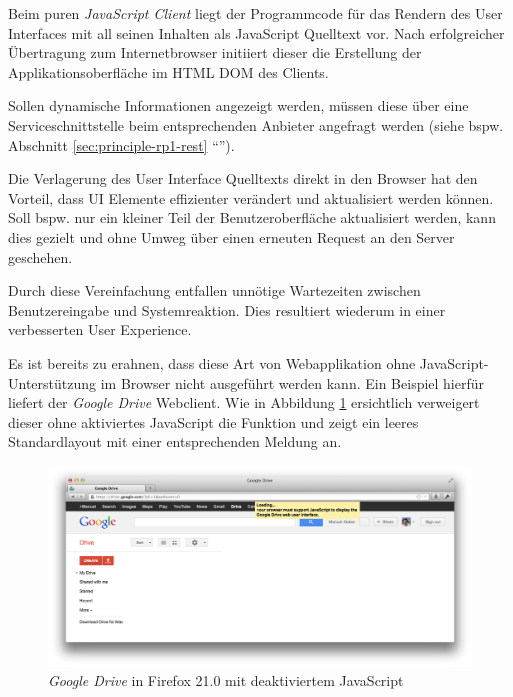 Beim puren \emph{JavaScript Client} liegt der Programmcode für das Rendern des User Interfaces mit all seinen Inhalten als JavaScript Quelltext vor. Nach erfolgreicher Übertragung zum Internetbrowser initiiert dieser die Erstellung der Applikationsoberfläche im HTML \gls{DOM} des Clients.

Sollen dynamische Informationen angezeigt werden, müssen diese über eine Serviceschnittstelle beim entsprechenden Anbieter angefragt werden (siehe bspw. Abschnitt \ref{sec:principle-rp1-rest} ``'').

Die Verlagerung des User Interface Quelltexts direkt in den Browser hat den Vorteil, dass UI Elemente effizienter verändert und aktualisiert werden können. Soll bspw. nur ein kleiner Teil der Benutzeroberfläche aktualisiert werden, kann dies gezielt und ohne Umweg über einen erneuten Request an den Server geschehen.

Durch diese Vereinfachung entfallen unnötige Wartezeiten zwischen Benutzereingabe und Systemreaktion. Dies resultiert wiederum in einer verbesserten User Experience.

Es ist bereits zu erahnen, dass diese Art von Webapplikation ohne JavaScript-Unterstützung im Browser nicht ausgeführt werden kann. Ein Beispiel hierfür liefert der \emph{Google Drive} \cite{GoogleDrive} Webclient. Wie in Abbildung \ref{fig:googleDriveNoJs} ersichtlich verweigert dieser ohne aktiviertes JavaScript die Funktion und zeigt ein leeres Standardlayout mit einer entsprechenden Meldung an.

\begin{figure}[H]
	\centering
	\includegraphics[width=12cm]{content/principle-demonstration/images/googledrive-nojs.png}
	\caption{\emph{Google Drive} in Firefox 21.0 mit deaktiviertem JavaScript}
	\label{fig:googleDriveNoJs}
\end{figure}

